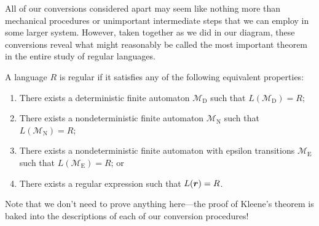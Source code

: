 All of our conversions considered apart may seem like nothing more than mechanical procedures or unimportant intermediate steps that we can employ in some larger system. However, taken together as we did in our diagram, these conversions reveal what might reasonably be called the most important theorem in the entire study of regular languages.

\begin{theorem}\label{thm:kleene}
A language $R$ is regular if it satisfies any of the following equivalent properties:
\begin{enumerate}
\item There exists a deterministic finite automaton $\mathcal{M}_{\text{D}}$ such that $L(\mathcal{M}_{\text{D}}) = R$;
\item There exists a nondeterministic finite automaton $\mathcal{M}_{\text{N}}$ such that $L(\mathcal{M}_{\text{N}}) = R$;
\item There exists a nondeterministic finite automaton with epsilon transitions $\mathcal{M}_{\text{E}}$ such that $L(\mathcal{M}_{\text{E}}) = R$; or
\item There exists a regular expression  such that $L(\bm r) = R$.
\end{enumerate}
\end{theorem}

Note that we don't need to prove anything here---the proof of Kleene's theorem is baked into the descriptions of each of our conversion procedures!